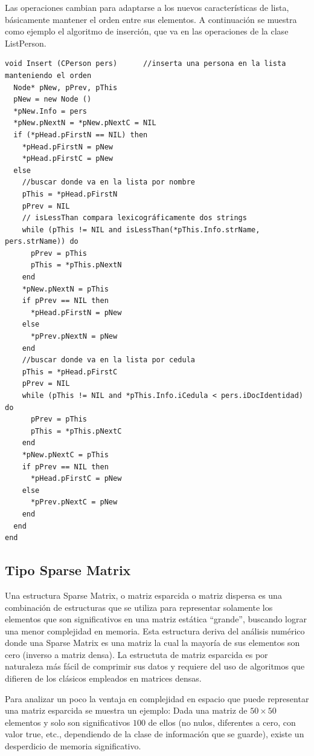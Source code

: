 Las operaciones cambian para adaptarse a los nuevos características de lista, básicamente mantener el orden entre sus elementos. A continuación se muestra como ejemplo el algoritmo de inserción, que va en las operaciones de la clase ListPerson.

\begin{lstlisting}[upquote=true, language=pseudo]
void Insert (CPerson pers)		//inserta una persona en la lista manteniendo el orden
  Node* pNew, pPrev, pThis
  pNew = new Node ()
  *pNew.Info = pers
  *pNew.pNextN = *pNew.pNextC = NIL
  if (*pHead.pFirstN == NIL) then
    *pHead.pFirstN = pNew
    *pHead.pFirstC = pNew
  else
    //buscar donde va en la lista por nombre
    pThis = *pHead.pFirstN
    pPrev = NIL
    // isLessThan compara lexicográficamente dos strings
    while (pThis != NIL and isLessThan(*pThis.Info.strName, pers.strName)) do
      pPrev = pThis
      pThis = *pThis.pNextN
    end
    *pNew.pNextN = pThis
    if pPrev == NIL then
      *pHead.pFirstN = pNew
    else
      *pPrev.pNextN = pNew
    end
    //buscar donde va en la lista por cedula
    pThis = *pHead.pFirstC
    pPrev = NIL
    while (pThis != NIL and *pThis.Info.iCedula < pers.iDocIdentidad) do
      pPrev = pThis
      pThis = *pThis.pNextC
    end
    *pNew.pNextC = pThis
    if pPrev == NIL then
      *pHead.pFirstC = pNew
    else
      *pPrev.pNextC = pNew
    end
  end
end
\end{lstlisting}
\subsection{Tipo Sparse Matrix} \label{sec:sparse}

Una estructura Sparse Matrix, o matriz esparcida o matriz dispersa es una combinación de estructuras que se utiliza para representar solamente los elementos que son significativos en una matriz estática “grande”, buscando lograr una menor complejidad en memoria. Esta estructura deriva del análisis numérico donde una Sparse Matrix es una matriz la cual la mayoría de sus elementos son cero (inverso a matriz densa). La estructuta de matriz esparcida es por naturaleza más fácil de comprimir sus datos y requiere del uso de algoritmos que difieren de los clásicos empleados en matrices densas.

Para analizar un poco la ventaja en complejidad en espacio que puede representar una matriz esparcida se muestra un ejemplo: Dada una matriz de $50 \times 50$ elementos y solo son significativos $100$ de ellos (no nulos, diferentes a cero, con valor true, etc., dependiendo de la clase de información que se guarde), existe un desperdicio de memoria significativo.

